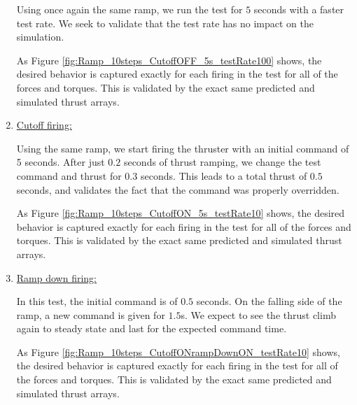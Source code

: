 \begin{enumerate}
	
	
	Using once again the same ramp, we run the test for $5$ seconds with a faster test rate. We seek to validate that the test rate has no impact on the simulation.
	
	
	
	As Figure \ref{fig:Ramp_10steps_CutoffOFF_5s_testRate100} shows, the desired behavior is captured exactly for each 
	firing in the test for all of the forces and torques. This is validated by the exact same predicted and simulated thrust arrays. 
	
	\item{\underline{Cutoff firing:}}
	
	
	
	Using the same ramp, we start firing the thruster with an initial command of 5 seconds. After just $0.2$ seconds of thrust ramping, we change the test command and thrust for $0.3$ seconds. This leads to a total thrust of $0.5$ seconds, and validates the fact that the command was properly overridden.
	
	
	
	As Figure \ref{fig:Ramp_10steps_CutoffON_5s_testRate10} shows, the desired behavior is captured exactly for each 
	firing in the test for all of the forces and torques. This is validated by the exact same predicted and simulated thrust arrays. 
	
	\item{\underline{Ramp down firing:}}
	
	
	
	In this test, the initial command is of $0.5$ seconds. On the falling side of the ramp, a new command is given for $1.5$s. We expect to see the thrust climb again to steady state and last for the expected command time.   
	
	
	
	As Figure \ref{fig:Ramp_10steps_CutoffONrampDownON_testRate10} shows, the desired behavior is captured exactly for each 
	firing in the test for all of the forces and torques. This is validated by the exact same predicted and simulated thrust arrays.  
	
\end{enumerate}




